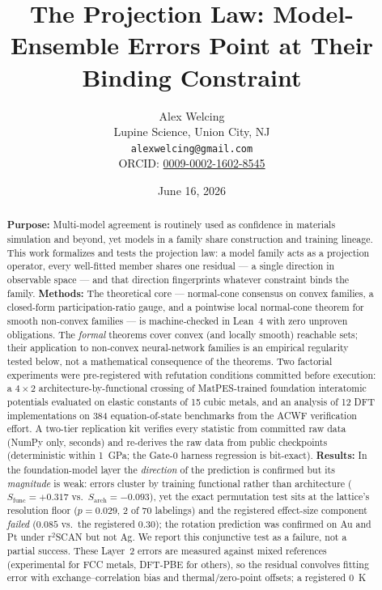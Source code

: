 \documentclass[11pt]{article}
\title{\bfseries The Projection Law: Model-Ensemble Errors Point at Their Binding Constraint}
\author{Alex Welcing\\ \small Lupine Science, Union City, NJ\\ \small \texttt{alexwelcing@gmail.com}\\ \small ORCID: \href{https://orcid.org/0009-0002-1602-8545}{0009-0002-1602-8545}}
\date{June 16, 2026}
\theoremstyle{remark}
\begin{document}
\maketitle

\begin{abstract}
\noindent\textbf{Purpose:} Multi-model agreement is routinely used as
confidence in materials simulation and beyond, yet models in a family share
construction and training lineage. This work formalizes and tests the
projection law: a model family acts as a projection operator, every
well-fitted member shares one residual --- a single direction in observable
space --- and that direction fingerprints whatever constraint binds the
family.
\textbf{Methods:} The theoretical core --- normal-cone consensus on convex
families, a closed-form participation-ratio gauge, and a pointwise local
normal-cone theorem for smooth non-convex families --- is machine-checked in
Lean~4 with zero unproven obligations. The
\emph{formal} theorems cover convex (and locally smooth) reachable sets; their
application to non-convex neural-network families is an empirical regularity
tested below, not a mathematical consequence of the theorems. Two factorial
experiments were pre-registered with refutation conditions committed before
execution: a $4{\times}2$ architecture-by-functional crossing of MatPES-trained
foundation interatomic potentials evaluated on elastic constants of 15 cubic
metals, and an analysis of 12 DFT implementations on 384 equation-of-state
benchmarks from the ACWF verification effort. A two-tier replication kit
verifies every statistic from committed raw data (NumPy only, seconds) and
re-derives the raw data from public checkpoints (deterministic within 1~GPa;
the Gate-0 harness regression is bit-exact).
\textbf{Results:} In the foundation-model layer the \emph{direction} of the
prediction is confirmed but its \emph{magnitude} is weak: errors cluster by
training functional rather than architecture ($S_{\mathrm{func}}{=}{+}0.317$
vs.\ $S_{\mathrm{arch}}{=}{-}0.093$), yet the exact permutation test sits at the
lattice's resolution floor ($p{=}0.029$, 2 of 70 labelings) and the registered
effect-size component \emph{failed} ($0.085$ vs.\ the registered $0.30$); the
rotation prediction was confirmed on Au and Pt under r$^2$SCAN but not Ag. We
report this conjunctive test as a failure, not a partial success. These Layer~2
errors are measured against mixed references (experimental for FCC metals,
DFT-PBE for others), so the residual convolves fitting error with
exchange--correlation bias and thermal/zero-point offsets; a registered 0~K

\end{abstract}
\end{document}
